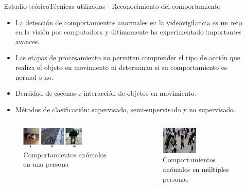 
\begin{frame}{Estudio teórico}{Técnicas utilizadas - Reconocimiento del comportamiento}

\begin{itemize}
    \justifying
    \item La detección de comportamientos anormales en la videovigilancia es un reto en la visión por computadora y últimamente ha experimentado importantes avances.
    \item Las etapas de procesamiento no permiten comprender el tipo de acción que realiza el objeto en movimiento ni determinan si su
comportamiento es normal o no.
    \item Densidad de escenas e interacción de objetos en movimiento.
    \item Métodos de clasificación: supervisado, semi-supervisado y no supervisado.
\end{itemize}

\begin{columns}

  \begin{column}{0.5\textwidth}
    \begin{figure}[ht]
    \centering
    \includegraphics[width=0.65\textwidth]{Images/estudio-teorico/Abnormal-behaviors-single-person.jpg}
    \caption{\label{fig:Abnormal-behaviors-single-person}Comportamientos anómalos en una persona}
    \end{figure}
  \end{column}
  
  \begin{column}{0.5\textwidth}  %
    \begin{figure}[ht]
    \centering
    \includegraphics[width=0.5\textwidth]{Images/estudio-teorico/abnormal-behaviors-crowded-scene.jpg}
    \caption{\label{abnormal-behaviors-crowded-scene}Comportamientos anómalos en múltiples personas}
    \end{figure}    
  \end{column}
  
\end{columns}

\end{frame}

